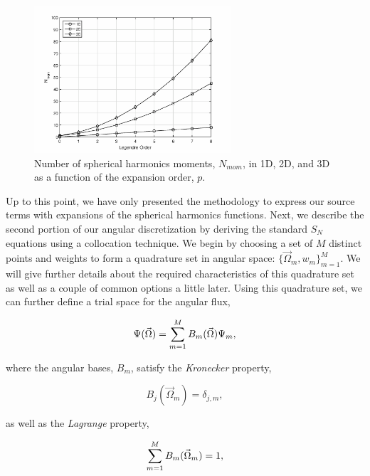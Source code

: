 \begin{figure}
\centering
\includegraphics[width=0.65\textwidth]{figures/sec_Sn/Num_Sph_Harm_Moments.eps}
\caption{Number of spherical harmonics moments, $N_{mom}$, in 1D, 2D, and 3D as a function of the expansion order, $p$.}
\label{fig::Sn_Num_Sph_Harm_Moments}
\end{figure}

Up to this point, we have only presented the methodology to express our source terms with expansions of the spherical harmonics functions. Next, we describe the second portion of our angular discretization by deriving the standard $S_N$ equations using a collocation technique. We begin by choosing a set of $M$ distinct points and weights to form a quadrature set in angular space: $\{  \vec{\Omega}_m, w_m \}_{m=1}^M$. We will give further details about the required characteristics of this quadrature set as well as a couple of common options a little later. Using this quadrature set, we can further define a trial space for the angular flux,

\begin{equation}
\label{eq::Sn_ang_flux_basis}
\Psi (\vec{\Omega}) = \sum\displaylimits_{m=1}^{M} B_m (\vec{\Omega})  \Psi_m ,
\end{equation}

\noindent where the angular bases, $B_m$, satisfy the {\em Kronecker} property,

\begin{equation}
\label{eq::Sn_ang_basis_kroneker}
 B_j (\vec{\Omega}_m) = \delta_{j,m}, 
\end{equation}

\noindent as well as the {\em Lagrange} property,

\begin{equation}
\label{eq::Sn_ang_basis_lagrange}
\sum\displaylimits_{m=1}^{M} B_m (\vec{\Omega}_m) = 1  ,
\end{equation}

